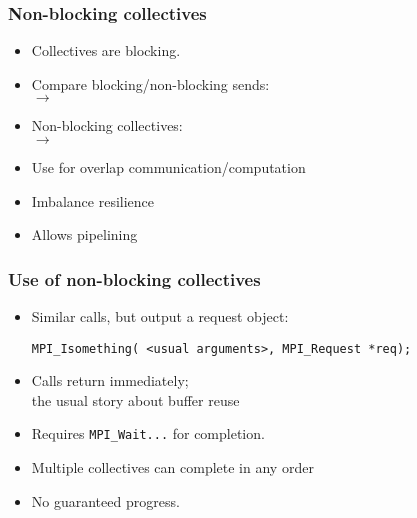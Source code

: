 

\begin{exerciseframe}[onenorm]
  
\end{exerciseframe}



\begin{frame}[containsverbatim]\frametitle{Non-blocking collectives}
  \begin{itemize}
  \item Collectives are blocking.
  \item Compare blocking/non-blocking sends:\\
     $\rightarrow$ 
  \item Non-blocking collectives:\\
     $\rightarrow$ 
  \item Use for overlap communication/computation
  \item Imbalance resilience
  \item Allows pipelining
  \end{itemize}
\end{frame}

\begin{frame}[containsverbatim]\frametitle{Use of non-blocking collectives}
  \begin{itemize}
  \item Similar calls, but output a request object:
\begin{lstlisting}
MPI_Isomething( <usual arguments>, MPI_Request *req);
\end{lstlisting}
  \item Calls return immediately;\\
    the usual story about buffer reuse
  \item Requires \lstinline{MPI_Wait}\texttt{...} for completion.
  \item Multiple collectives can complete in any order
  \item No guaranteed progress.
  \end{itemize}
\end{frame}


